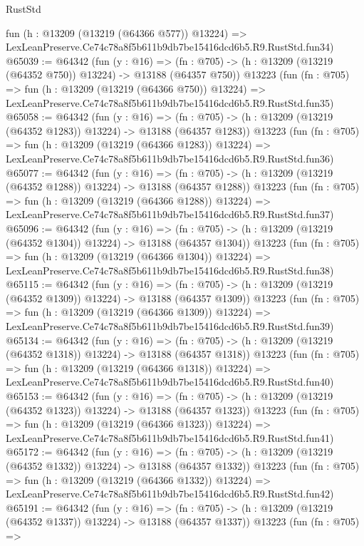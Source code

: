 \begin{lexlean}{RustStd}
\begin{coremodule}
    fun (h : @13209 (@13219 (@64366 @577)) @13224) =>
    LexLeanPreserve.Ce74c78a8f5b611b9db7be15416dcd6b5.R9.RustStd.fun34)
@65039 := @64342
    (fun (y : @16) =>
    (fn : @705) -> (h : @13209 (@13219 (@64352 @750)) @13224) -> @13188 (@64357 @750))
    @13223
    (fun (fn : @705) =>
    fun (h : @13209 (@13219 (@64366 @750)) @13224) =>
    LexLeanPreserve.Ce74c78a8f5b611b9db7be15416dcd6b5.R9.RustStd.fun35)
@65058 := @64342
    (fun (y : @16) =>
    (fn : @705) -> (h : @13209 (@13219 (@64352 @1283)) @13224) -> @13188 (@64357 @1283))
    @13223
    (fun (fn : @705) =>
    fun (h : @13209 (@13219 (@64366 @1283)) @13224) =>
    LexLeanPreserve.Ce74c78a8f5b611b9db7be15416dcd6b5.R9.RustStd.fun36)
@65077 := @64342
    (fun (y : @16) =>
    (fn : @705) -> (h : @13209 (@13219 (@64352 @1288)) @13224) -> @13188 (@64357 @1288))
    @13223
    (fun (fn : @705) =>
    fun (h : @13209 (@13219 (@64366 @1288)) @13224) =>
    LexLeanPreserve.Ce74c78a8f5b611b9db7be15416dcd6b5.R9.RustStd.fun37)
@65096 := @64342
    (fun (y : @16) =>
    (fn : @705) -> (h : @13209 (@13219 (@64352 @1304)) @13224) -> @13188 (@64357 @1304))
    @13223
    (fun (fn : @705) =>
    fun (h : @13209 (@13219 (@64366 @1304)) @13224) =>
    LexLeanPreserve.Ce74c78a8f5b611b9db7be15416dcd6b5.R9.RustStd.fun38)
@65115 := @64342
    (fun (y : @16) =>
    (fn : @705) -> (h : @13209 (@13219 (@64352 @1309)) @13224) -> @13188 (@64357 @1309))
    @13223
    (fun (fn : @705) =>
    fun (h : @13209 (@13219 (@64366 @1309)) @13224) =>
    LexLeanPreserve.Ce74c78a8f5b611b9db7be15416dcd6b5.R9.RustStd.fun39)
@65134 := @64342
    (fun (y : @16) =>
    (fn : @705) -> (h : @13209 (@13219 (@64352 @1318)) @13224) -> @13188 (@64357 @1318))
    @13223
    (fun (fn : @705) =>
    fun (h : @13209 (@13219 (@64366 @1318)) @13224) =>
    LexLeanPreserve.Ce74c78a8f5b611b9db7be15416dcd6b5.R9.RustStd.fun40)
@65153 := @64342
    (fun (y : @16) =>
    (fn : @705) -> (h : @13209 (@13219 (@64352 @1323)) @13224) -> @13188 (@64357 @1323))
    @13223
    (fun (fn : @705) =>
    fun (h : @13209 (@13219 (@64366 @1323)) @13224) =>
    LexLeanPreserve.Ce74c78a8f5b611b9db7be15416dcd6b5.R9.RustStd.fun41)
@65172 := @64342
    (fun (y : @16) =>
    (fn : @705) -> (h : @13209 (@13219 (@64352 @1332)) @13224) -> @13188 (@64357 @1332))
    @13223
    (fun (fn : @705) =>
    fun (h : @13209 (@13219 (@64366 @1332)) @13224) =>
    LexLeanPreserve.Ce74c78a8f5b611b9db7be15416dcd6b5.R9.RustStd.fun42)
@65191 := @64342
    (fun (y : @16) =>
    (fn : @705) -> (h : @13209 (@13219 (@64352 @1337)) @13224) -> @13188 (@64357 @1337))
    @13223
    (fun (fn : @705) =>

\end{coremodule}
\end{lexlean}
